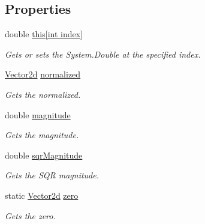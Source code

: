 \subsection*{Properties}
\begin{DoxyCompactItemize}
\item 
double \hyperlink{struct_unity_engine_1_1_vector2d_a4b9f5ceed4df5579d77bc58e5438696f}{this\mbox{[}int index\mbox{]}}
\begin{DoxyCompactList}\small\item\em Gets or sets the System.\+Double at the specified index. \end{DoxyCompactList}\item 
\hyperlink{struct_unity_engine_1_1_vector2d}{Vector2d} \hyperlink{struct_unity_engine_1_1_vector2d_a492999ea891d5f6e75f09b329e35a60d}{normalized}
\begin{DoxyCompactList}\small\item\em Gets the normalized. \end{DoxyCompactList}\item 
double \hyperlink{struct_unity_engine_1_1_vector2d_a7ea59fa974fb365eb2892878b207767a}{magnitude}
\begin{DoxyCompactList}\small\item\em Gets the magnitude. \end{DoxyCompactList}\item 
double \hyperlink{struct_unity_engine_1_1_vector2d_a3c4796bbf71edd26f246e4fca38799d2}{sqr\+Magnitude}
\begin{DoxyCompactList}\small\item\em Gets the S\+QR magnitude. \end{DoxyCompactList}\item 
static \hyperlink{struct_unity_engine_1_1_vector2d}{Vector2d} \hyperlink{struct_unity_engine_1_1_vector2d_a57cc55a0bda185d893c26e8645c17fe4}{zero}
\begin{DoxyCompactList}\small\item\em Gets the zero. \end{DoxyCompactList}\item 

\end{DoxyCompactItemize}
